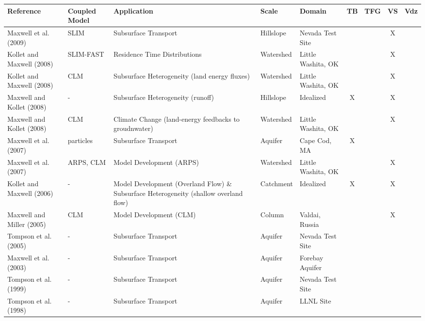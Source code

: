 {\begin{table}
\begin{tabular}{ l  p{1.5cm} p{2cm} p{1.5cm} p{1.5cm} | c | c | c | c }
\bf{Reference} & \bf{Coupled Model} & \bf{Application} & \bf{Scale} & \bf{Domain} & \bf{TB} & \bf{TFG} & \bf{VS} & \bf{Vdz} \\ 
\hline{}

\cite{MTK09} Maxwell et al. (2009) & SLIM & Subsurface Transport & Hillslope & Nevada Test Site &   &   & X &     \\
\cite{KM08b} Kollet and Maxwell (2008) & SLIM-FAST & Residence Time Distributions  & Watershed & Little Washita, OK &   &   & X &     \\
\cite{KM08a} Kollet and Maxwell (2008) & CLM & Subsurface Heterogeneity (land energy fluxes) & Watershed & Little Washita, OK &   &   & X &     \\
\cite{MK08b} Maxwell and Kollet (2008) & - & Subsurface Heterogeneity (runoff) & Hillslope & Idealized & X &   & X &     \\
\cite{MK08a} Maxwell and Kollet (2008) & CLM & Climate Change (land-energy feedbacks to groudnwater) & Watershed & Little Washita, OK &   &   & X &     \\
\cite{MWH07} Maxwell et al. (2007) & particles & Subsurface Transport & Aquifer & Cape Cod, MA & X &   &   &     \\
\cite{MCK07} Maxwell et al. (2007) & ARPS, CLM & Model Development (ARPS) & Watershed & Little Washita, OK &   &   & X &     \\
\cite{KM06} Kollet and Maxwell (2006) & - & Model Development (Overland Flow) \& Subsurface Heterogeneity (shallow overland flow) & Catchment & Idealized & X &   & X &     \\
\cite{MM05} Maxwell and Miller (2005) & CLM & Model Development (CLM) & Column & Valdai, Russia &   &   & X &     \\
\cite{TMCZPS05} Tompson et al. (2005) & - & Subsurface Transport & Aquifer & Nevada Test Site &   &   &   &     \\
\cite{MWT03} Maxwell et al. (2003) & - & Subsurface Transport & Aquifer & Forebay Aquifer &   &   &   &     \\
\cite{TBP99} Tompson et al. (1999) & - & Subsurface Transport & Aquifer & Nevada Test Site &   &   &   &     \\
\cite{TFSBA98} Tompson et al. (1998) & - & Subsurface Transport & Aquifer & LLNL Site &   &   &   &     \\
\end{tabular}
\label{pfref4}
\end{table}

}
